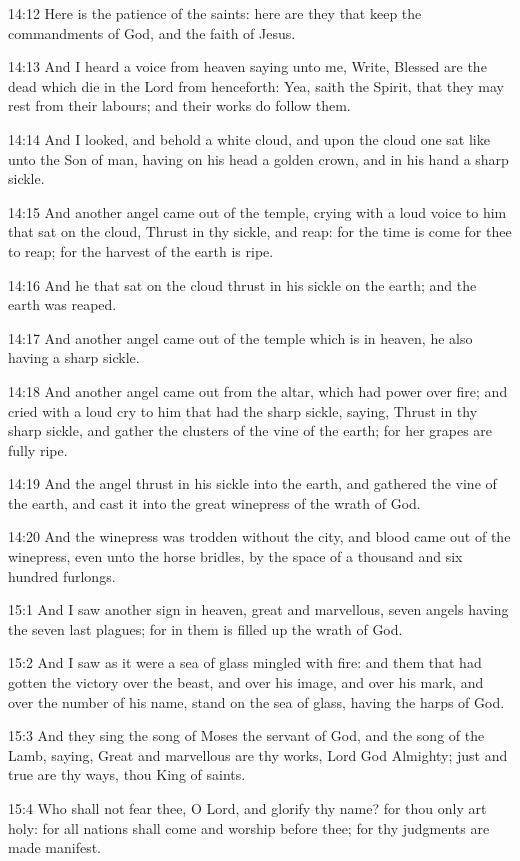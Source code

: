 14:12 Here is the patience of the saints: here are they that keep the commandments of God, and the faith of Jesus.

14:13 And I heard a voice from heaven saying unto me, Write, Blessed are the dead which die in the Lord from henceforth: Yea, saith the Spirit, that they may rest from their labours; and their works do follow them.

14:14 And I looked, and behold a white cloud, and upon the cloud one sat like unto the Son of man, having on his head a golden crown, and in his hand a sharp sickle.

14:15 And another angel came out of the temple, crying with a loud voice to him that sat on the cloud, Thrust in thy sickle, and reap: for the time is come for thee to reap; for the harvest of the earth is ripe.

14:16 And he that sat on the cloud thrust in his sickle on the earth; and the earth was reaped.

14:17 And another angel came out of the temple which is in heaven, he also having a sharp sickle.

14:18 And another angel came out from the altar, which had power over fire; and cried with a loud cry to him that had the sharp sickle, saying, Thrust in thy sharp sickle, and gather the clusters of the vine of the earth; for her grapes are fully ripe.

14:19 And the angel thrust in his sickle into the earth, and gathered the vine of the earth, and cast it into the great winepress of the wrath of God.

14:20 And the winepress was trodden without the city, and blood came out of the winepress, even unto the horse bridles, by the space of a thousand and six hundred furlongs.

15:1 And I saw another sign in heaven, great and marvellous, seven angels having the seven last plagues; for in them is filled up the wrath of God.

15:2 And I saw as it were a sea of glass mingled with fire: and them that had gotten the victory over the beast, and over his image, and over his mark, and over the number of his name, stand on the sea of glass, having the harps of God.

15:3 And they sing the song of Moses the servant of God, and the song of the Lamb, saying, Great and marvellous are thy works, Lord God Almighty; just and true are thy ways, thou King of saints.

15:4 Who shall not fear thee, O Lord, and glorify thy name? for thou only art holy: for all nations shall come and worship before thee; for thy judgments are made manifest.

